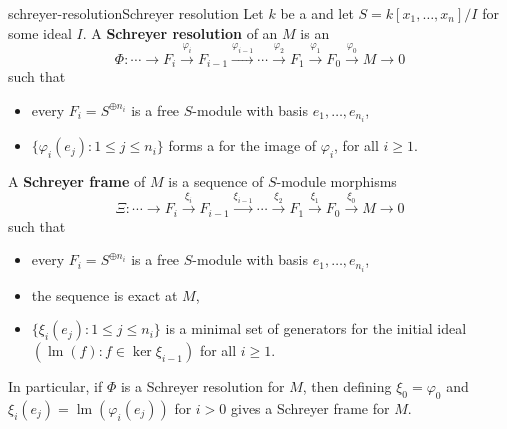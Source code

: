 \begin{topic}{schreyer-resolution}{Schreyer resolution}
    Let $k$ be a  and let $S = k[x_1, \ldots, x_n] / I$ for some ideal $I$.
    A \textbf{Schreyer resolution} of an  $M$ is an 
    \[ \Phi \colon \cdots \to F_i \xrightarrow{\varphi_i} F_{i - 1} \xrightarrow{\varphi_{i - 1}} \cdots \xrightarrow{\varphi_2} F_1 \xrightarrow{\varphi_1} F_0 \xrightarrow{\varphi_0} M \to 0 \]
    such that
    \begin{itemize}
        \item every $F_i = S^{\oplus n_i}$ is a free $S$-module with basis $e_1, \ldots, e_{n_i}$,
        \item $\{ \varphi_i(e_j) : 1 \le j \le n_i \}$ forms a  for the image of $\varphi_i$, for all $i \ge 1$.
    \end{itemize}
    
    A \textbf{Schreyer frame} of $M$ is a sequence of $S$-module morphisms
    \[ \Xi \colon \cdots \to F_i \xrightarrow{\xi_i} F_{i - 1} \xrightarrow{\xi_{i - 1}} \cdots \xrightarrow{\xi_2} F_1 \xrightarrow{\xi_1} F_0 \xrightarrow{\xi_0} M \to 0 \]
    such that
    \begin{itemize}
        \item every $F_i = S^{\oplus n_i}$ is a free $S$-module with basis $e_1, \ldots, e_{n_i}$,
        \item the sequence is exact at $M$,
        \item $\{ \xi_i(e_j) : 1 \le j \le n_i \}$ is a minimal set of generators for the initial ideal $(\operatorname{lm}(f) : f \in \ker \xi_{i - 1})$ for all $i \ge 1$.
    \end{itemize}
    In particular, if $\Phi$ is a Schreyer resolution for $M$, then defining $\xi_0 = \varphi_0$ and $\xi_i(e_j) = \operatorname{lm}(\varphi_i(e_j))$ for $i > 0$ gives a Schreyer frame for $M$.
\end{topic}

